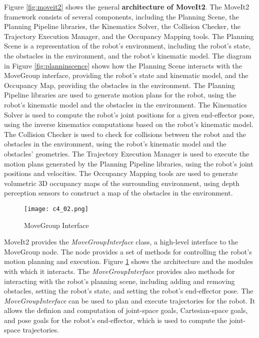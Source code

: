 Figure \ref{fig:moveit2} shows the general \textbf{architecture of MoveIt2}. The MoveIt2 framework consists of several
components, including the Planning Scene, the Planning Pipeline libraries, the Kinematics Solver, the Collision
Checker, the Trajectory Execution Manager, and the Occupancy Mapping tools.
The Planning Scene is a representation of the robot's environment, including the robot's state, the obstacles in the
environment, and the robot's kinematic model. The diagram in Figure \ref{fig:planninscence} shows how the Planning Scene
interacts with the MoveGroup interface, providing the robot's state and kinematic model, and the Occupancy Map,
providing the obstacles in the environment. The Planning Pipeline libraries are used to generate motion plans
for the robot, using the robot's kinematic model and the obstacles in the environment. The Kinematics Solver is
used to compute the robot's joint positions for a given end-effector pose, using the inverse kinematics
computations based on the robot's kinematic model. The Collision Checker is used to check for collisions between
the robot and the obstacles in the environment, using the robot's kinematic model and the obstacles' geometries.
The Trajectory Execution Manager is used to execute the motion plans generated by the Planning Pipeline libraries,
using the robot's joint positions and velocities. The Occupancy Mapping tools are used to generate volumetric 3D 
occupancy maps of the surrounding environment, using depth perception sensors to construct a map
of the obstacles in the environment. 

\begin{figure}[t]
    \centering
    \texttt{[image: c4\_02.png]}
    \caption{MoveGroup Interface}
    \label{fig:move_group}
\end{figure}

MoveIt2 provides the \textit{MoveGroupInterface} class, a high-level interface to the MoveGroup node. The node
provides a set of methods for controlling the robot's motion planning and execution. 
Figure \ref{fig:move_group} shows the architecture and the modules with which it interacts.
The \textit{MoveGroupInterface} provides also methods for interacting with the robot's planning scene, 
including adding and removing obstacles, setting the robot's state, and setting the robot's end-effector pose. 
The \textit{MoveGroupInterface} can be used to plan and execute trajectories for the robot. 
It allows the definion and computation of joint-space goals, Cartesian-space goals,
and pose goals for the robot's end-effector, which is used to compute the joint-space trajectories.

